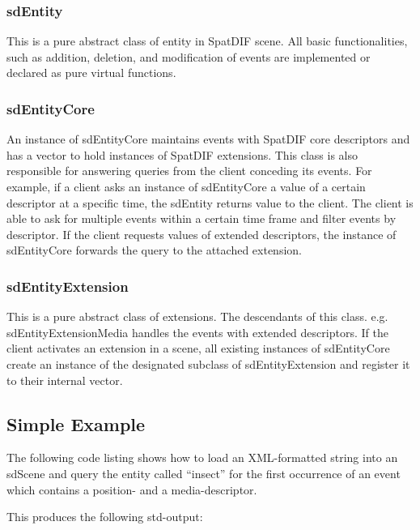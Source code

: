 \documentclass[a4paper]{article}
\begin{document}
\subsubsection{sdEntity}
This is a pure abstract class of entity in SpatDIF scene. All basic functionalities, such as addition, deletion, and modification of events are implemented or declared as pure virtual functions.

\subsubsection{sdEntityCore}
An instance of sdEntityCore maintains events with SpatDIF core descriptors and has a vector to hold instances of SpatDIF extensions. This class is also responsible for answering queries from the client conceding its events. For example, if a client asks an instance of sdEntityCore a value of a certain descriptor at a specific time, the sdEntity returns value to the client. The client is able to ask for multiple events within a certain time frame and filter events by descriptor. If the client requests values of extended descriptors, the instance of sdEntityCore forwards the query to the attached extension.

\subsubsection{sdEntityExtension}
This is a pure abstract class of extensions. The descendants of this class. e.g. sdEntityExtensionMedia handles the events with extended descriptors. If the client activates an extension in a scene, all existing instances of sdEntityCore create an instance of the designated subclass of sdEntityExtension and register it to their internal vector.

\subsection{Simple Example}
The following code listing shows how to load an XML-formatted string into an sdScene and query the entity called ``insect'' for the first occurrence of an event which contains a position- and a media-descriptor.

\vfill

 

\noindent This produces the following std-output: 
 
\end{document}
